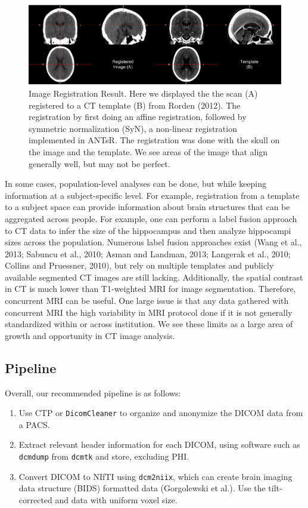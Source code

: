 \documentclass[utf8]{frontiersSCNS}
\providecommand{\tightlist}{%
  \setlength{\itemsep}{0pt}\setlength{\parskip}{0pt}}
\begin{document}
\begin{figure}
\includegraphics[width=1\linewidth]{frontiers_files/figure-latex/reg-1} \caption{Image Registration Result.  Here we displayed the the scan (A) registered to a CT template (B) from Rorden (2012).  The registration by first doing an affine registration, followed by symmetric normalization (SyN), a non-linear registration implemented in ANTsR. The registration was done with the skull on the image and the template.  We see areas of the image that align generally well, but may not be perfect.}\label{fig:reg}
\end{figure}

In some cases, population-level analyses can be done, but while keeping information at a subject-specific level. For example, registration from a template to a subject space can provide information about brain structures that can be aggregated across people. For example, one can perform a label fusion approach to CT data to infer the size of the hippocampus and then analyze hippocampi sizes across the population. Numerous label fusion approaches exist (Wang et al., 2013; Sabuncu et al., 2010; Asman and Landman, 2013; Langerak et al., 2010; Collins and Pruessner, 2010), but rely on multiple templates and publicly available segmented CT images are still lacking. Additionally, the spatial contrast in CT is much lower than T1-weighted MRI for image segmentation. Therefore, concurrent MRI can be useful. One large issue is that any data gathered with concurrent MRI the high variability in MRI protocol done if it is not generally standardized within or across institution. We see these limits as a large area of growth and opportunity in CT image analysis.

\hypertarget{pipeline}{%
\subsection{Pipeline}\label{pipeline}}

Overall, our recommended pipeline is as follows:

\begin{enumerate}
\def\labelenumi{\arabic{enumi}.}
\tightlist
\item
  Use CTP or \texttt{DicomCleaner} to organize and anonymize the DICOM data from a PACS.
\item
  Extract relevant header information for each DICOM, using software such as \texttt{dcmdump} from \texttt{dcmtk} and store, excluding PHI.
\item
  Convert DICOM to NIfTI using \texttt{dcm2niix}, which can create brain imaging data structure (BIDS) formatted data (Gorgolewski et al.). Use the tilt-corrected and data with uniform voxel size.
\end{enumerate}
\end{document}
